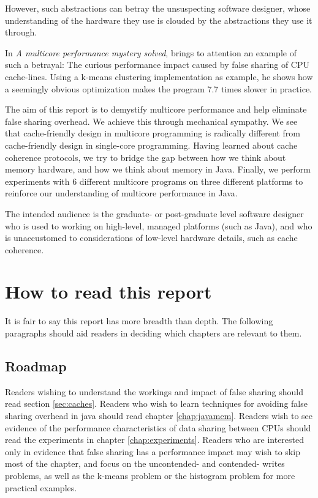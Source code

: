 However, such abstractions can betray the unsuspecting software designer, whose
understanding of the hardware they use is clouded by the abstractions they use
it through.

In \textit{A multicore performance mystery solved}\cite{mystery},
\citeauthor{mystery} brings to attention an example of such a betrayal: The
curious performance impact caused by false sharing of CPU cache-lines. Using a
k-means clustering implementation as example, he shows how a seemingly obvious
optimization makes the program 7.7 times slower in practice.

The aim of this report is to demystify multicore performance and help eliminate
false sharing overhead. We achieve this through mechanical sympathy. We see that
cache-friendly design in multicore programming is radically different from
cache-friendly design in single-core programming. Having learned about cache
coherence protocols, we try to bridge the gap between how we think about memory
hardware, and how we think about memory in Java. Finally, we perform experiments
with 6 different multicore programs on three different platforms to reinforce our
understanding of multicore performance in Java.

The intended audience is the graduate- or post-graduate level software designer
who is used to working on high-level, managed platforms (such as Java), and who
is unaccustomed to considerations of low-level hardware details, such as cache
coherence.

\chapter{How to read this report}
It is fair to say this report has more breadth than depth. The following
paragraphs should aid readers in deciding which chapters are relevant to them.

\section{Roadmap}
Readers wishing to understand the workings and impact of false sharing should
read section \ref{sec:caches}. Readers who wish to learn techniques for avoiding
false sharing overhead in java should read chapter \ref{chap:javamem}. Readers
wish to see evidence of the performance characteristics of data sharing between
CPUs should read the experiments in chapter \ref{chap:experiments}. Readers who
are interested only in evidence that false sharing has a performance impact may
wish to skip most of the chapter, and focus on the uncontended- and contended-
writes problems, as well as the k-means problem or the histogram problem for
more practical examples.

